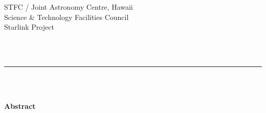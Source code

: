 \begin{latexonly}
   STFC / {\sc Joint Astronomy Centre, Hawaii} \hfill {\bf \stardocname}\\
   {\large Science \& Technology Facilities Council}\\
   {\large Starlink Project\\}
   {\large \stardoccategory\ \stardocnumber}
   \begin{flushright}
   \stardocauthors\\
   \stardocdate
   \end{flushright}
   \vspace{-4mm}
   \rule{\textwidth}{0.5mm}
   \vspace{5mm}
   \begin{center}
   {\Huge\bf  \stardoctitle \\ [2.5ex]}
   {\LARGE\bf \stardocversion \\ [4ex]}
   {\Huge\bf  \stardocmanual}
   \end{center}
   \vspace{5mm}

   \vspace{10mm}
   \begin{center}
      {\Large\bf Abstract}
   \end{center}
\end{latexonly}

